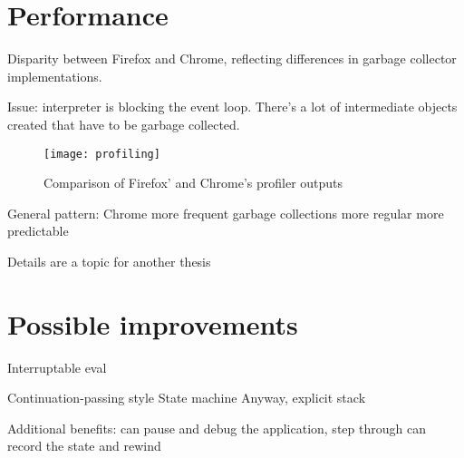 \section{Performance}
Disparity between Firefox and Chrome, reflecting differences in garbage collector implementations.

Issue: interpreter is blocking the event loop.
There's a lot of intermediate objects created that have to be garbage collected.

\begin{figure}[h!]
	\centering
	\texttt{[image: profiling]}
	\caption{Comparison of Firefox' and Chrome's profiler outputs}
	\label{fig:profiling}
\end{figure}

General pattern:
Chrome more frequent garbage collections
more regular
more predictable

Details are a topic for another thesis

\section{Possible improvements}
Interruptable eval

Continuation-passing style
State machine
Anyway, explicit stack

Additional benefits:
	can pause and debug the application, step through
	can record the state and rewind
